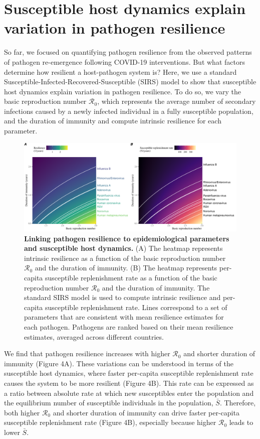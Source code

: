 \documentclass[12pt]{article}
\begin{document}
\section*{Susceptible host dynamics explain variation in pathogen resilience}

So far, we focused on quantifying pathogen resilience from the observed patterns of pathogen re-emergence following COVID-19 interventions.
But what factors determine how resilient a host-pathogen system is?
Here, we use a standard Susceptible-Infected-Recovered-Susceptible (SIRS) model to show that susceptible host dynamics explain variation in pathogen resilience.
To do so, we vary the basic reproduction number $\mathcal R_0$, which represents the average number of secondary infections caused by a newly infected individual in a fully susceptible population, and the duration of immunity and compute intrinsic resilience for each parameter.

\begin{figure}[!th]
\begin{center}
\includegraphics[width=\textwidth]{../figure_summary/figure_summary.pdf}
\caption{
\textbf{Linking pathogen resilience to epidemiological parameters and susceptible host dynamics.}
(A) The heatmap represents intrinsic resilience as a function of the basic reproduction number $\mathcal R_0$ and the duration of immunity.
(B) The heatmap represents per-capita susceptible replenishment rate as a function of the basic reproduction number $\mathcal R_0$ and the duration of immunity.
The standard SIRS model is used to compute intrinsic resilience and per-capita susceptible replenishment rate.
Lines correspond to a set of parameters that are consistent with mean resilience estimates for each pathogen.
Pathogens are ranked based on their mean resilience estimates, averaged across different countries.
}
\end{center}
\end{figure}

We find that pathogen resilience increases with higher $\mathcal R_0$ and shorter duration of immunity (Figure 4A).
These variations can be understood in terms of the susceptible host dynamics, where faster per-capita susceptible replenishment rate causes the system to be more resilient (Figure 4B).
This rate can be expressed as a ratio between absolute rate at which new susceptibles enter the population and the equilibrium number of susceptible individuals in the population, $\bar{S}$.
Therefore, both higher $\mathcal R_0$ and shorter duration of immunity can drive faster per-capita susceptible replenishment rate  (Figure 4B), especially because higher $\mathcal R_0$ leads to lower $\bar{S}$.
\end{document}
